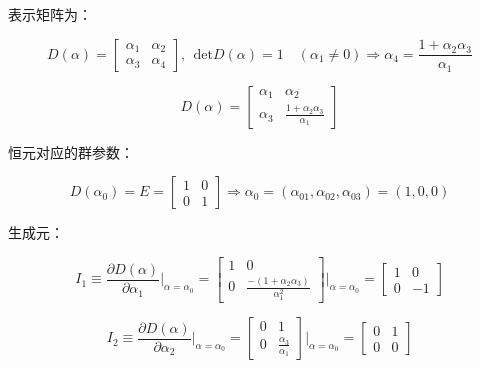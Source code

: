 表示矩阵为：

\begin{equation}
D\left(\alpha\right)
=\begin{bmatrix}
\alpha_1 &\alpha_2 \\
\alpha_3 &\alpha_4
\end{bmatrix},~~
\mathrm{det}D\left(\alpha\right) = 1
\quad \left(\alpha_1\ne0\right)\Longrightarrow
\alpha_4 = \frac{1+\alpha_2\alpha_3 }{\alpha_1 }
\end{equation}

\begin{equation}
D\left(\alpha\right)
=\begin{bmatrix}
\alpha_1 &\alpha_2 \\
\alpha_3 &\frac{1+\alpha_2\alpha_3 }{\alpha_1 }
\end{bmatrix}
\end{equation}

恒元对应的群参数：

\begin{equation}
D\left(\alpha_0\right)
=E
=\begin{bmatrix}
1 &0 \\
0 &1
\end{bmatrix}
\Longrightarrow
\alpha_0
=\left(\alpha_{01},\alpha_{02},\alpha_{03}\right)
=\left(1,0,0\right)
\end{equation}

生成元：

\begin{equation}
I_1
\equiv \frac{\partial D\left(\alpha\right) }{\partial \alpha_1 }\bigg|_{\alpha=\alpha_0}
=\begin{bmatrix}
1 &0 \\
0 &\frac{-\left(1+\alpha_2\alpha_3\right) }{\alpha_1^2 }
\end{bmatrix} \bigg|_{\alpha=\alpha_0}
=\begin{bmatrix}
1 &0 \\
0 &-1
\end{bmatrix}
\end{equation}

\begin{equation}
I_2
\equiv \frac{\partial D\left(\alpha\right) }{\partial \alpha_2 }\bigg|_{\alpha=\alpha_0}
=\begin{bmatrix}
0 &1 \\
0 &\frac{\alpha_3 }{\alpha_1 } 
\end{bmatrix} \bigg|_{\alpha=\alpha_0}
=\begin{bmatrix}
0 &1 \\
0 &0
\end{bmatrix}
\end{equation}

